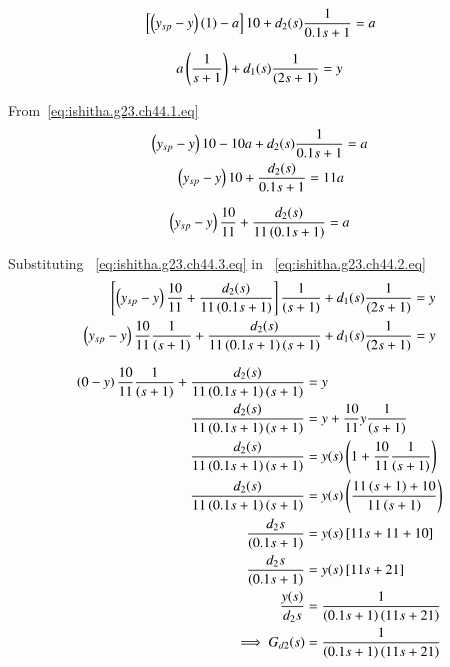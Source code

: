 \documentclass[journal,12pt,onecolumn]{IEEEtran}
\theoremstyle{remark}
\begin{document}
\begin{equation}
{}\left[\left(y_{sp}-y\right)(1) -a\right]10+ d_2(s)\frac{1}{0.1s+1} =a \\ \label{eq:ishitha.g23.ch44.1.eq}
\end{equation}

\begin{equation}
a\left(\frac{1}{s+1}\right) + d_1(s)\frac{1}{(2s+1)} =y \\  \label{eq:ishitha.g23.ch44.2.eq}
\end{equation}

From~\eqref{eq:ishitha.g23.ch44.1.eq}
\begin{align}
\left(y_{sp}-y\right)10 -10a + d_2(s)\frac{1}{0.1s+1}&=a \\
\left(y_{sp}-y\right)10 + \frac{d_2(s)}{0.1s+1} =11a 
\end{align}

\begin{equation}
\left(y_{sp}-y\right)\frac{10}{11} + \frac{d_2(s)}{11\left(0.1s+1\right)} = a \\ \label{eq:ishitha.g23.ch44.3.eq}
\end{equation}

Substituting ~\eqref{eq:ishitha.g23.ch44.3.eq} in ~\eqref{eq:ishitha.g23.ch44.2.eq}
\begin{align}
{}\left[\left(y_{sp}-y\right)\frac{10}{11} + \frac{d_2(s)}{11\left(0.1s+1\right)}  \right]\frac{1}{\left(s+1\right)} + d_1(s)\frac{1}{(2s+1)} &= y \\
\left(y_{sp}-y\right)\frac{10}{11}\frac{1}{\left(s+1\right)} + \frac{d_2(s)}{11\left(0.1s+1\right)\left(s+1\right)} +  d_1(s)\frac{1}{(2s+1)} &= y 
\end{align} 

\begin{align}
\left(0-y\right)\frac{10}{11}\frac{1}{\left(s+1\right)} + \frac{d_2(s)}{11\left(0.1s+1\right)\left(s+1\right)} &= y \\
\frac{d_2(s)}{11\left(0.1s+1\right)\left(s+1\right)} &= y + \frac{10}{11}y\frac{1}{\left(s+1\right)} \\
\frac{d_2(s)}{11\left(0.1s+1\right)\left(s+1\right)} &= y(s)\left(1 + \frac{10}{11}\frac{1}{\left(s+1\right)}\right) \\
\frac{d_2(s)}{11\left(0.1s+1\right)\left(s+1\right)} &= y(s)\left(\frac{11\left(s+1\right)+10}{11\left(s+1\right)}\right) \\
\frac{d_2{s}}{\left(0.1s+1\right)} &= y(s){}\left[11s+ 11 +10\right] \\
\frac{d_2{s}}{\left(0.1s+1\right)} &= y(s){}\left[11s+21\right] \\
\frac{y(s)}{d_2{s}} &= \frac{1}{\left(0.1s+1\right)\left(11s+21\right)} \\
\implies G_{d2}(s) &= \frac{1}{\left(0.1s+1\right)\left(11s+21\right)}
\end{align}
\end{document}
